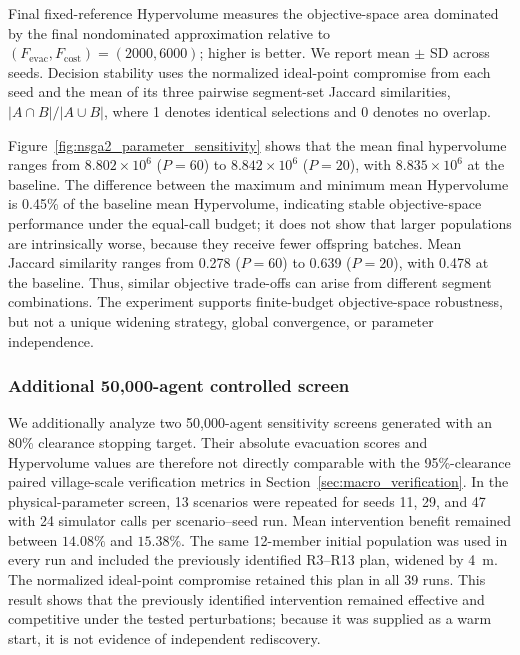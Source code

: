\documentclass[preprint,12pt]{elsarticle}
\begin{document}
{Final fixed-reference Hypervolume measures the objective-space area dominated by the final nondominated approximation relative to $(F_{\mathrm{evac}},F_{\mathrm{cost}})=(2000,6000)$; higher is better. We report mean $\pm$ SD across seeds. Decision stability uses the normalized ideal-point compromise from each seed and the mean of its three pairwise segment-set Jaccard similarities, $|A\cap B|/|A\cup B|$, where 1 denotes identical selections and 0 denotes no overlap.

Figure~\ref{fig:nsga2_parameter_sensitivity} shows that the mean final hypervolume ranges from $8.802\times10^6$ ($P=60$) to $8.842\times10^6$ ($P=20$), with $8.835\times10^6$ at the baseline. The difference between the maximum and minimum mean Hypervolume is 0.45\% of the baseline mean Hypervolume, indicating stable objective-space performance under the equal-call budget; it does not show that larger populations are intrinsically worse, because they receive fewer offspring batches. Mean Jaccard similarity ranges from 0.278 ($P=60$) to 0.639 ($P=20$), with 0.478 at the baseline. Thus, similar objective trade-offs can arise from different segment combinations. The experiment supports finite-budget objective-space robustness, but not a unique widening strategy, global convergence, or parameter independence.

\subsubsection{Additional 50,000-agent controlled screen}
We additionally analyze two 50,000-agent sensitivity screens generated with an 80\% clearance stopping target. Their absolute evacuation scores and Hypervolume values are therefore not directly comparable with the 95\%-clearance paired village-scale verification metrics in Section~\ref{sec:macro_verification}. In the physical-parameter screen, 13 scenarios were repeated for seeds 11, 29, and 47 with 24 simulator calls per scenario--seed run. Mean intervention benefit remained between $14.08\%$ and $15.38\%$. The same 12-member initial population was used in every run and included the previously identified R3--R13 plan, widened by 4~m. The normalized ideal-point compromise retained this plan in all 39 runs. This result shows that the previously identified intervention remained effective and competitive under the tested perturbations; because it was supplied as a warm start, it is not evidence of independent rediscovery.

}
\end{document}
